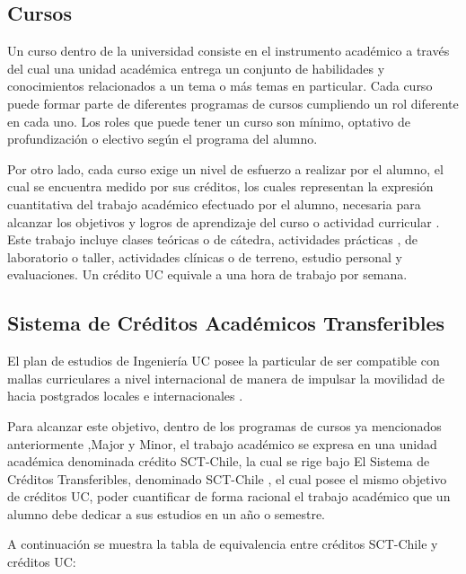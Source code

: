 \subsection{Cursos \label{sec:cursos}}

Un curso dentro de la universidad consiste en el instrumento académico a través del cual una unidad académica entrega un conjunto de habilidades y conocimientos relacionados a un tema o más temas en particular. Cada curso puede formar parte de diferentes programas de cursos cumpliendo un rol diferente en cada uno. Los roles que puede tener un curso son mínimo, optativo de profundización o electivo según el programa del alumno.

Por otro lado, cada curso exige un nivel de esfuerzo a realizar por el alumno, el cual se encuentra medido por sus créditos, los cuales representan la expresión cuantitativa del trabajo académico efectuado por el alumno, necesaria para alcanzar los objetivos y logros de aprendizaje del curso o actividad curricular \cite{creditsUC}. Este trabajo incluye clases teóricas o de cátedra, actividades prácticas , de laboratorio o taller, actividades clínicas o de terreno, estudio personal y evaluaciones. Un crédito UC equivale a una hora de trabajo por semana.\cite{creditsUC}

\subsection{Sistema de Créditos Académicos Transferibles \label{sec:transferible_credits}}

El plan de estudios de Ingeniería UC posee la particular de ser compatible con mallas curriculares a nivel internacional de manera de impulsar la movilidad de hacia postgrados locales e internacionales \cite{ingwebsite}.

Para alcanzar este objetivo, dentro de los programas de cursos ya mencionados anteriormente ,Major y Minor, el trabajo académico se expresa en una unidad académica denominada crédito SCT-Chile, la cual se rige bajo El Sistema de Créditos Transferibles, denominado SCT-Chile \cite{set_chile}, el cual posee el mismo objetivo de créditos UC, poder cuantificar de forma racional el trabajo académico que un alumno debe dedicar a sus estudios en un año o semestre.

A continuación se muestra la tabla de equivalencia entre créditos SCT-Chile y créditos UC:

